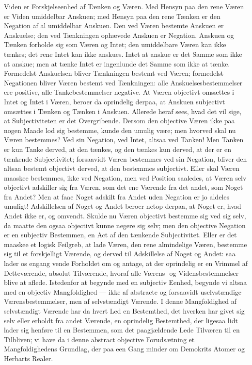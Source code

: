 \documentclass[11pt]{book}
\newcommand{\opage}[1]{\marginnote{\footnotesize\textit{[#1]}}}
\begin{document}
\opage{12} \setcounter{footnote}{0}%
Viden er Forskjelseenhed af Tænken og Væren. Med Hensyn paa den
rene Væren er Viden umiddelbar Anskuen; med Hensyn paa den rene
Tænken er den Negation af al umiddelbar Anskuen. Den ved Væren
bestemte Anskuen er Anskuelse; den ved Tænkningen ophævede Anskuen
er Negation. Anskuen og Tænken forholde sig som Væren og Intet; den
umiddelbare Væren kan ikke tænkes; det rene Intet kan ikke anskues.
Intet at anskue er det Samme som ikke at anskue; men at tænke Intet
er ingenlunde det Samme som ikke at tænke. Formedelst Anskuelsen
bliver Tænkningen bestemt ved Væren; formedelst Negationen bliver
Væren bestemt ved Tænkningen: alle Anskuelsesbestemmelser ere
positive, alle Tankebestemmelser negative. At Væren objectivt
omsættes i Intet og Intet i Væren, beroer da oprindelig derpaa, at
Anskuen subjectivt omsættes i Tænken og Tænken i Anskuen. Allerede
heraf sees, hvad det vil sige, at Subjectiviteten er det Overgribende.
Dersom den objective Væren ikke paa nogen Maade lod sig bestemme,
kunde den umulig være; men hvorved skal nu Væren bestemmes? Ved sin
Negation, ved Intet, altsaa ved Tanken! Men Tanken er kun Tanke
derved, at den tænkes, og den tænkes kun derved, at der er en
tænkende Subjectivitet; forsaavidt Væren bestemmes ved sin Negation,
bliver den altsaa bestemt objectivt derved, at den bestemmes
subjectivt. Eller skal Væren maaskee bestemmes, ikke ved Negation,
men ved Position saaledes, at Væren selv objectivt adskiller sig fra
Væren, som det ene Værende fra det andet, som Noget fra Andet? Men
at faae Noget adskilt fra Andet uden Negation er jo aldeles umuligt!
Adskillelsen af Noget og Andet beroer netop derpaa, at Noget er, hvad
Andet ikke er, og omvendt. Skulde nu Væren objectivt bestemme sig ved
sig selv, da maatte den ogsaa objectivt kunne negere sig
\opage{13} \setcounter{footnote}{0}%
selv; men den objective Negation er en subjectiv Bestemmen, en Act af
den tænkende Subjectivitet. Eller er det maaskee et logisk Feilgreb,
at lade Væren, den rene almindelige Væren, bestemme sig til et
forskjelligt Værende, og derved til Adskillelse af Noget og Andet:
saa lader os engang vende Forholdet om og antage, at der oprindelig
er en Vrimmel af Detteværende, absolut Tilværende, hvoraf alle
Værens- og Vidensbestemmelser blive at aflede. Istedenfor at begynde
med en subjectiv Eenhed, begynde vi altsaa med en objectiv
Mangfoldighed --- ikke af abstracte og forsaavidt uselvstændige
Værensbestemmelser, men af selvstændigt Værende. I denne
Mangfoldighed af selvstændigt Værende har da hvert Led en Bestemthed,
det hverken har givet sig selv eller erholdt fra andet Værende, en
oprindelig Bestemthed, der ligesaa lidt lader sig henføre til en
Bestemmen, som det paagjældende Lede Tilværen til en Tilbliven; vi
have da i denne abstract objective Forudsætning et Mangfoldighedens
Grundlag, der paa een Gang minder om Demokrits Atomer og Herbarts
Realer.
\end{document}
